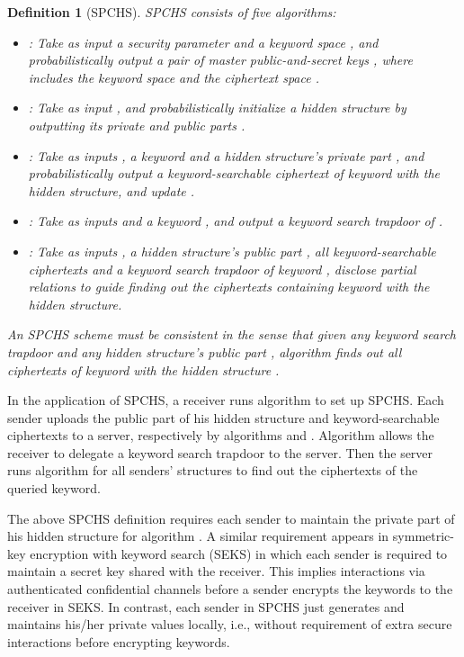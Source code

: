 \documentclass[10pt,twocolumn,twoside]{IEEEtran}
\newtheorem{definition}{Definition}
\begin{document}
\begin{definition}[SPCHS]\label{D.SPCHS.Concept}
SPCHS consists of five algorithms:
\begin{itemize}
\item : Take as input a security parameter  and a keyword space , and probabilistically output a pair of master public-and-secret keys , where  includes the keyword space  and the ciphertext space .

\item : Take as input , and probabilistically initialize a hidden structure by outputting its private and public parts .

\item : Take as inputs , a keyword  and a hidden structure's private part , and probabilistically output a keyword-searchable ciphertext  of keyword  with the hidden structure, and update .

\item : Take as inputs  and a keyword , and output a keyword search trapdoor  of .

\item : Take as inputs , a hidden structure's public part , all keyword-searchable ciphertexts  and a keyword search trapdoor  of keyword , disclose partial relations to guide finding out the ciphertexts containing keyword  with the hidden structure.
\end{itemize}
An SPCHS scheme must be consistent in the sense that given any keyword search trapdoor  and any hidden structure's public part , algorithm  finds out all ciphertexts of keyword  with the hidden structure .
\end{definition}

In the application of SPCHS, a receiver runs algorithm  to set up SPCHS. Each sender uploads the public part of his hidden structure and keyword-searchable ciphertexts to a server, respectively by algorithms  and . Algorithm  allows the receiver to delegate a keyword search trapdoor to the server. Then the server runs algorithm  for all senders' structures to find out the ciphertexts of the queried keyword.

The above SPCHS definition requires each sender to maintain the private part of his hidden structure for algorithm . A similar requirement appears in symmetric-key encryption with keyword search (SEKS) in which each sender is required to maintain a secret key shared with the receiver. This implies interactions via authenticated confidential channels before a sender encrypts the keywords to the receiver in SEKS. In contrast,  each sender in SPCHS just generates and maintains his/her private values locally, i.e., without requirement of extra secure interactions before encrypting keywords. 
\end{document}
